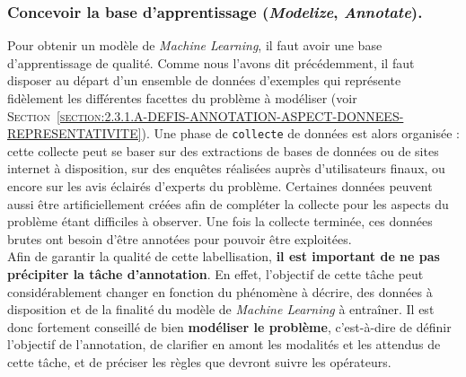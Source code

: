 		\subsubsection{Concevoir la base d'apprentissage (\textit{\textbf{M}odelize}, \textit{\textbf{A}nnotate}).}
		\label{section:2.2.1.A-ORGANISATION-ANNOTATION-ETAPES-CLES-MODELIZE-ANNOTATE}
		
			Pour obtenir un modèle de \textit{Machine Learning}, il faut avoir une base d'apprentissage de qualité.
			Comme nous l'avons dit précédemment, il faut disposer au départ d'un ensemble de données d'exemples qui représente fidèlement les différentes facettes du problème à modéliser (voir \textsc{Section~\ref{section:2.3.1.A-DEFIS-ANNOTATION-ASPECT-DONNEES-REPRESENTATIVITE}}).
			Une phase de \texttt{collecte} de données est alors organisée : cette collecte peut se baser sur des extractions de bases de données ou de sites internet à disposition, sur des enquêtes réalisées auprès d'utilisateurs finaux, ou encore sur les avis éclairés d'experts du problème.
			Certaines données peuvent aussi être artificiellement créées afin de compléter la collecte pour les aspects du problème étant difficiles à observer.
			Une fois la collecte terminée, ces données brutes ont besoin d'être annotées pour pouvoir être exploitées. \\
			
			
			Afin de garantir la qualité de cette labellisation, \textbf{il est important de ne pas précipiter la tâche d'annotation}.
			En effet, l'objectif de cette tâche peut considérablement changer en fonction du phénomène à décrire, des données à disposition et de la finalité du modèle de \textit{Machine Learning} à entraîner.
			Il est donc fortement conseillé de bien \textbf{modéliser le problème}, c'est-à-dire de définir l'objectif de l'annotation, de clarifier en amont les modalités et les attendus de cette tâche, et de préciser les règles que devront suivre les opérateurs.
			
